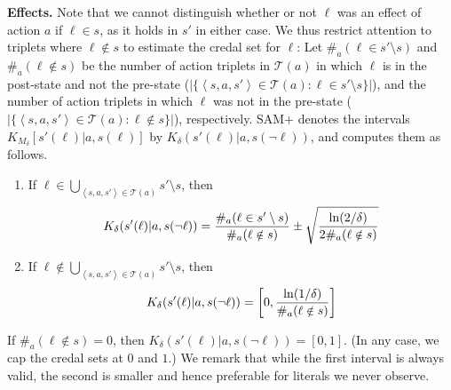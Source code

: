 \documentclass[letterpaper]{article} %
\newcommand{\tuple}[1]{\ensuremath{\left \langle #1 \right \rangle }}
\begin{document}
\noindent \textbf{Effects.} 
Note that we cannot distinguish whether or not $\ell$ was an effect of action $a$ if $\ell\in s$, as it holds in $s'$ in either case. We thus restrict attention to triplets where $\ell\notin s$ to estimate the credal set for $\ell$: 
Let $\#_a(\ell\in s'\setminus s)$ and $\#_a(\ell\notin s)$ 
be the number of action triplets in $\mathcal{T}(a)$ in which $\ell$ is in the post-state and not the pre-state ($|\{\tuple{s, a, s'}\in \mathcal{T}(a):\ell\in s'\setminus s\}|$), 
and the number of action triplets in which $\ell$ was not in the pre-state 
($|\{\tuple{s, a, s'}\in \mathcal{T}(a):\ell\notin s\}|$), respectively. 
SAM+ denotes the intervals $K_{M_\delta}[s'(\ell)|a,s(\ell)]$ 
by $K_\delta(s'(\ell)|a,s(\neg \ell))$, and computes them as follows.
\begin{enumerate}
    \item If $\ell \in \bigcup_{\tuple{s, a, s'}\in \mathcal{T}(a)} s'\setminus s$, 
then 
\begin{equation}
\small
    K_\delta(s'(\ell)|a,s(\neg \ell)) = \frac{\#_a(\ell\in s'\setminus s)}{\#_a(\ell\notin s)} \pm\sqrt{\frac{\ln(2/\delta)}{2\#_a(\ell\notin s)}}
    \label{eq:present-effects}
\end{equation}
\item If $\ell\notin\bigcup_{\tuple{s, a, s'}\in \mathcal{T}(a)} s'\setminus s$, then 
\begin{equation}
\small
    K_\delta(s'(\ell)|a,s(\neg \ell)) = \left[0,\frac{\ln(1/\delta)}{\#_a(\ell\notin s)}\right]
    \label{eq:missing-effects}
\end{equation}
\end{enumerate}
If $\#_a(\ell\notin s)=0$, then $K_\delta(s'(\ell)|a,s(\neg\ell))=[0,1]$. (In any case, we cap the credal sets at $0$ and $1$.) We remark that while the first interval is always valid, the second is smaller and hence preferable for literals we never observe.


\end{document}
